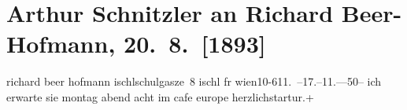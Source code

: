 

         
         \renewcommand{\erwaehntePersonen}{Personen: Richard Beer-Hofmann}
         \renewcommand{\erwaehnteOrte}{Orte: Bad Ischl, Café de l’Europe, Schulgasse, Wien}
         \renewcommand{\erwaehnteWerke}{}
               \section[Arthur Schnitzler an Richard Beer-Hofmann, 20. 8. {[}1893{]}]{ Arthur Schnitzler an Richard Beer-Hofmann, 20. 8. {[}1893{]}}\nopagebreak{}\rehead{ }\begin{ledgroupsized}[t]{13cm}\normalsize\beginnumbering \toendnotes[C]{\smallbreak\pagebreak[2]} 
\pstart{}{\pb}richard beer hofmann ischl\pend{}\pstart{}schulgasze 8\pend{}{\bigskip}\pstart
           \noindent{}{\pb}ischl
                  fr{ }wien10-611. –17.–11.—50–\pend
           \pstart
           ich erwarte sie montag{ }abend
                  acht im cafe europe\pend
           \pstart herzlichst\spacefill\mbox{artur.+}\pend{}
         
         \endnumbering{}\end{ledgroupsized}  \newcommand{\dateiname}{L00258}\newcommand{\titel}{Arthur Schnitzler an Richard Beer-Hofmann, 20. 8. [1893]}\newcommand{\editorInnen}{Martin Anton Müller und Gerd-Hermann Susen}
      
